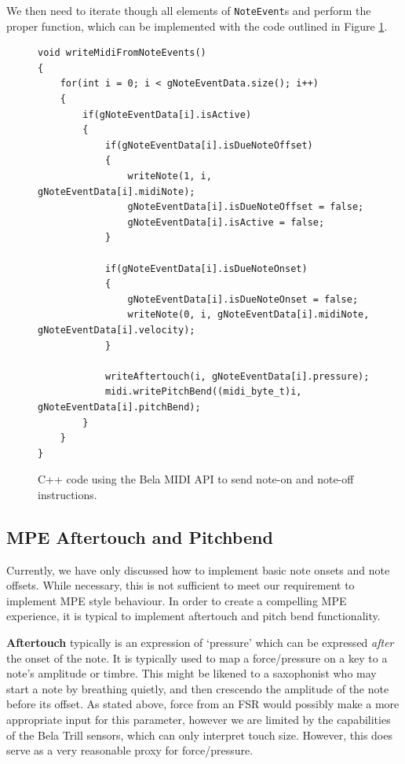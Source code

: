 We then need to iterate though all elements of \texttt{NoteEvent}s and perform the proper function, which can be implemented with the code outlined in Figure \ref{fig:write_midi_function}.

\begin{figure}[h]
\begin{mdframed}
\begin{lstlisting}
void writeMidiFromNoteEvents()
{
    for(int i = 0; i < gNoteEventData.size(); i++)
    {
        if(gNoteEventData[i].isActive)
        {
            if(gNoteEventData[i].isDueNoteOffset)
            {
                writeNote(1, i, gNoteEventData[i].midiNote);
                gNoteEventData[i].isDueNoteOffset = false;
                gNoteEventData[i].isActive = false;
            }
			
            if(gNoteEventData[i].isDueNoteOnset)
            {
                gNoteEventData[i].isDueNoteOnset = false;
                writeNote(0, i, gNoteEventData[i].midiNote, gNoteEventData[i].velocity);
            }
				
            writeAftertouch(i, gNoteEventData[i].pressure);
            midi.writePitchBend((midi_byte_t)i, gNoteEventData[i].pitchBend);
        }
    }
}
\end{lstlisting}
\end{mdframed}
    \caption{C++ code using the Bela MIDI API to send note-on and note-off instructions.}
    \label{fig:write_midi_function}
\end{figure}


\subsection{MPE Aftertouch and Pitchbend}

Currently, we have only discussed how to implement basic note onsets and note offsets. While necessary, this is not sufficient to meet our requirement to implement MPE style behaviour. In order to create a compelling MPE experience, it is typical to implement aftertouch and pitch bend functionality. 

\textbf{Aftertouch} typically is an expression of `pressure' which can be expressed \textit{after} the onset of the note. It is typically used to map a force/pressure on a key to a note's amplitude or timbre. This might be likened to a saxophonist who may start a note by breathing quietly, and then crescendo the amplitude of the note before its offset. As stated above, force from an FSR would possibly make a more appropriate input for this parameter, however we are limited by the capabilities of the Bela Trill sensors, which can only interpret touch size. However, this does serve as a very reasonable proxy for force/pressure.

